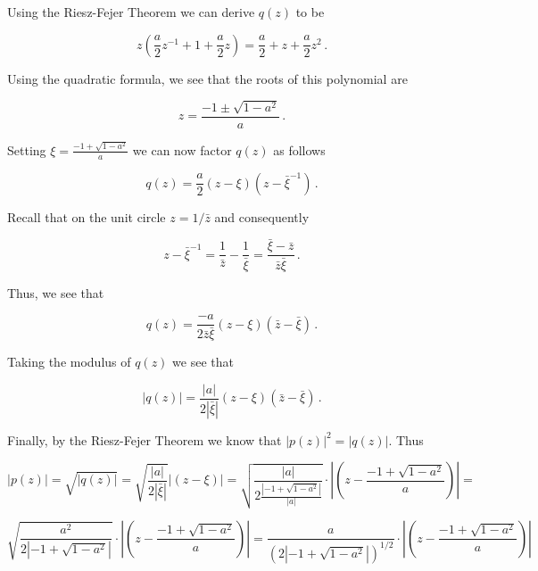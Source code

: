 \documentclass[a4paper]{article}
\newcommand {\m} {\cdot}
\numberwithin{equation}{section}
\begin{document}
\begin{description}
\begin{description}
	Using the Riesz-Fejer Theorem we can derive $q(z)$ to be
	
	$$z(\frac{a}{2}z^{-1} + 1 + \frac{a}{2}z) = \frac{a}{2} + z + \frac{a}{2}z^2\,.$$
	
	Using the quadratic formula, we see that the roots of this polynomial are
	
	$$z = \frac{-1 \pm \sqrt{1-a^2}}{a}\,.$$
	
	Setting $\xi = \frac{-1 + \sqrt{1-a^2}}{a}$ we can now factor $q(z)$ as follows
	
	$$q(z) = \frac{a}{2}(z - \xi)(z- \bar{\xi}^{-1})\,.$$
	
	Recall that on the unit circle $z = 1/\bar{z}$ and consequently
	
	$$z- \bar{\xi}^{-1} = \frac{1}{\bar{z}}- \frac{1}{\bar{\xi}} = \frac{\bar{\xi} - \bar{z}}{\bar{z}\bar{\xi}}\,.$$
	
	Thus, we see that
	
	$$q(z) = \frac{-a}{2\bar{z}\bar{\xi}}(z - \xi)(\bar{z}- \bar{\xi})\,.$$

	Taking the modulus of $q(z)$ we see that
	
	$$|q(z)| = \frac{|a|}{2|\bar{\xi}|}(z - \xi)(\bar{z}- \bar{\xi})\,.$$
	
	Finally, by the Riesz-Fejer Theorem we know that $|p(z)|^2 = |q(z)|$. Thus
	
	$$|p(z)| = \sqrt{|q(z)|} = \sqrt{\frac{|a|}{2|\bar{\xi}|}}|(z - \xi)| = \sqrt{\frac{|a|}{2\frac{|-1 + \sqrt{1-a^2}|}{|a|}}}\m|(z - \frac{-1 + \sqrt{1-a^2}}{a})| = $$
	
	$$\sqrt{\frac{a^2}{2|-1 + \sqrt{1-a^2}|}}\m|(z - \frac{-1 + \sqrt{1-a^2}}{a})| = \frac{a}{(2|-1 + \sqrt{1-a^2}|)^{1/2}}\m|(z - \frac{-1 + \sqrt{1-a^2}}{a})|$$
	
	
\end{description}

\end{description}
\end{document}
